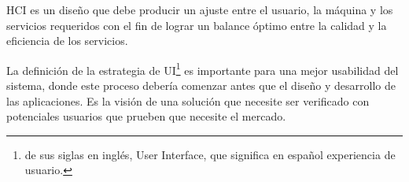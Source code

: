 HCI es un diseño que debe producir un ajuste entre el usuario, la máquina y los servicios requeridos con el fin de lograr un balance óptimo entre la calidad y la eficiencia de los servicios.

La definición de la estrategia de UI\footnote{de sus siglas en inglés, User Interface, que significa en español experiencia de usuario.} es importante para una mejor usabilidad del sistema, donde este proceso debería comenzar antes que el diseño y desarrollo de las aplicaciones. Es la visión de una solución que necesite ser verificado con potenciales usuarios que prueben que necesite el mercado\citep{levy_ux_2015}.

